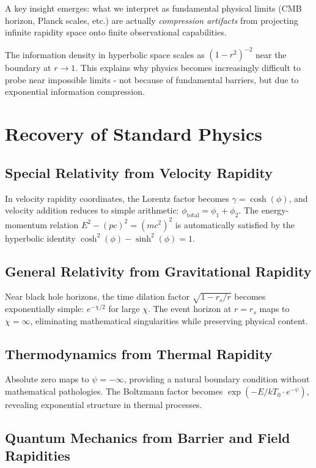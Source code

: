 \documentclass[12pt,a4paper]{article}
\begin{document}
A key insight emerges: what we interpret as fundamental physical limits (CMB 
horizon, Planck scales, etc.) are actually \textit{compression artifacts} from 
projecting infinite rapidity space onto finite observational capabilities.

The information density in hyperbolic space scales as $(1-r^2)^{-2}$ near the 
boundary at $r \to 1$. This explains why physics becomes increasingly difficult 
to probe near impossible limits - not because of fundamental barriers, but due 
to exponential information compression.

\section{Recovery of Standard Physics}

\subsection{Special Relativity from Velocity Rapidity}

In velocity rapidity coordinates, the Lorentz factor becomes $\gamma = \cosh(\phi)$, 
and velocity addition reduces to simple arithmetic: $\phi_{\text{total}} = \phi_1 + \phi_2$. 
The energy-momentum relation $E^2 - (pc)^2 = (mc^2)^2$ is automatically 
satisfied by the hyperbolic identity $\cosh^2(\phi) - \sinh^2(\phi) = 1$.

\subsection{General Relativity from Gravitational Rapidity}

Near black hole horizons, the time dilation factor $\sqrt{1 - r_s/r}$ becomes 
exponentially simple: $e^{-\chi/2}$ for large $\chi$. The event horizon at 
$r = r_s$ maps to $\chi = \infty$, eliminating mathematical singularities while 
preserving physical content.

\subsection{Thermodynamics from Thermal Rapidity}

Absolute zero maps to $\psi = -\infty$, providing a natural boundary condition 
without mathematical pathologies. The Boltzmann factor becomes $\exp(-E/kT_0 \cdot e^{-\psi})$, 
revealing exponential structure in thermal processes.

\subsection{Quantum Mechanics from Barrier and Field Rapidities}
\end{document}
